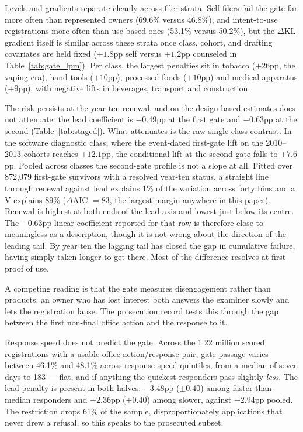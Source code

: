 \documentclass[11pt]{article}
\newcommand{\dkl}{$\Delta$KL}
\begin{document}
Levels and gradients separate cleanly across filer strata. Self-filers
fail the gate far more often than represented owners (69.6\% versus
46.8\%), and intent-to-use registrations more often than use-based ones
(53.1\% versus 50.2\%),
but the \dkl{} gradient itself is similar across these strata once class,
cohort, and drafting covariates are held fixed ($+1.8$pp self versus
$+1.2$pp counseled in Table~\ref{tab:gate_lpm}). Per class, the largest penalties sit in tobacco ($+26$pp, the
vaping era), hand tools ($+10$pp), processed foods ($+10$pp) and medical
apparatus ($+9$pp), with negative lifts in beverages, transport and
construction.

The risk persists at the year-ten renewal, and on the design-based
estimates does not attenuate: the lead coefficient is $-0.49$pp at the first
gate and $-0.63$pp at the second (Table~\ref{tab:staged}). What attenuates is
the raw single-class contrast. In the
software diagnostic class, where the event-dated first-gate lift on the
2010--2013 cohorts reaches $+12.1$pp, the conditional lift at the second
gate falls to $+7.6$pp. Pooled across classes the second-gate profile is not
a slope at all. Fitted over 872{,}079 first-gate survivors with a resolved
year-ten status, a straight line through renewal against lead explains 1\% of
the variation across forty bins and a V explains 89\%
($\Delta$AIC $= 83$, the largest margin anywhere in this paper). Renewal is
highest at both ends of the lead axis and lowest just below its centre. The
$-0.63$pp linear coefficient reported for that row is therefore close to
meaningless as a description, though it is not wrong about the direction of the
leading tail. By year ten the lagging tail has closed the gap in cumulative
failure, having simply taken longer to get there. Most of the difference
resolves at first proof of use.

A competing reading is that the gate measures disengagement rather than
products: an owner who has lost interest both answers the examiner slowly
and lets the registration lapse. The prosecution record tests this through
the gap between the first non-final office action and the response to it.

Response speed does not predict the gate. Across the 1.22 million scored
registrations with a usable office-action/response pair, gate passage varies
between 46.1\% and 48.1\% across response-speed quintiles, from a median of
seven days to 183 --- flat, and if anything the quickest responders pass
slightly \emph{less}. The lead penalty is present in both halves: $-3.48$pp
($\pm 0.40$) among faster-than-median responders and $-2.36$pp ($\pm 0.40$)
among slower, against $-2.94$pp pooled. The restriction drops 61\% of
the sample, disproportionately applications that never drew a refusal, so
this speaks to the prosecuted subset.
\end{document}
